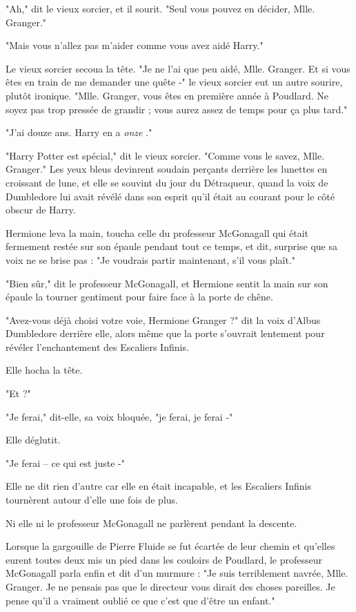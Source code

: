 "Ah," dit le vieux sorcier, et il sourit. "Seul vous pouvez en décider, Mlle. Granger."

"Mais vous n'allez pas m'aider comme vous avez aidé Harry."

Le vieux sorcier secoua la tête. "Je ne l'ai que peu aidé, Mlle. Granger. Et si vous êtes en train de me demander une quête -" le vieux sorcier eut un autre sourire, plutôt ironique. "Mlle. Granger, vous êtes en première année à Poudlard. Ne soyez pas trop pressée de grandir ; vous aurez assez de temps pour ça plus tard."

"J'ai douze ans. Harry en a \emph{onze} ."

"Harry Potter est spécial," dit le vieux sorcier. "Comme vous le savez, Mlle. Granger." Les yeux bleus devinrent soudain perçants derrière les lunettes en croissant de lune, et elle se souvint du jour du Détraqueur, quand la voix de Dumbledore lui avait révélé dans son esprit qu'il était au courant pour le côté obscur de Harry.

Hermione leva la main, toucha celle du professeur McGonagall qui était fermement restée sur son épaule pendant tout ce temps, et dit, surprise que sa voix ne se brise pas : "Je voudrais partir maintenant, s'il vous plaît."

"Bien sûr," dit le professeur McGonagall, et Hermione sentit la main sur son épaule la tourner gentiment pour faire face à la porte de chêne.

"Avez-vous déjà choisi votre voie, Hermione Granger ?" dit la voix d'Albus Dumbledore derrière elle, alors même que la porte s'ouvrait lentement pour révéler l'enchantement des Escaliers Infinis.

Elle hocha la tête.

"Et ?"

"Je ferai," dit-elle, sa voix bloquée, "je ferai, je ferai -"

Elle déglutit.

"Je ferai – ce qui est juste -"

Elle ne dit rien d'autre car elle en était incapable, et les Escaliers Infinis tournèrent autour d'elle une fois de plus.

Ni elle ni le professeur McGonagall ne parlèrent pendant la descente.

Lorsque la gargouille de Pierre Fluide se fut écartée de leur chemin et qu'elles eurent toutes deux mis un pied dans les couloirs de Poudlard, le professeur McGonagall parla enfin et dit d'un murmure : "Je suis terriblement navrée, Mlle. Granger. Je ne pensais pas que le directeur vous dirait des choses pareilles. Je pense qu'il a vraiment oublié ce que c'est que d'être un enfant."

